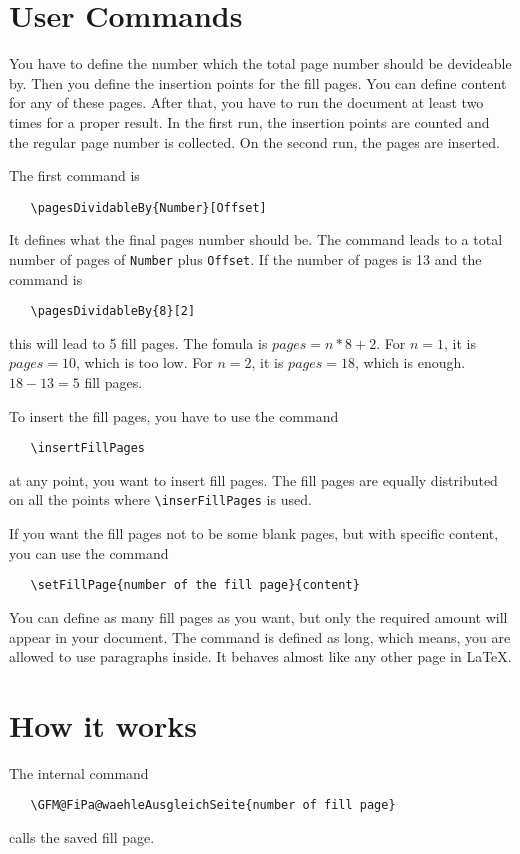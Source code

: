\documentclass[12pt,a4paper]{scrreprt}
\begin{document}
\section{User Commands}
You have to define the number which the total page number should be devideable by. Then you define the insertion points for the fill pages. You can define content for any of these pages. After that, you have to run the document at least two times for a proper result. In the first run, the insertion points are counted and the regular page number is collected. On the second run, the pages are inserted.

The first command is
\begin{verbatim}
   \pagesDividableBy{Number}[Offset]
\end{verbatim}
It defines what the final pages number should be. The command leads to a total number of pages of \verb+Number+ plus \verb+Offset+. If the number of pages is 13 and the command is
\begin{verbatim}
   \pagesDividableBy{8}[2]
\end{verbatim}
this will lead to 5 fill pages. The fomula is $pages = n * 8 + 2$. For $n = 1$, it is $pages = 10$, which is too low. For $n = 2$, it is $pages = 18$, which is enough. $18 - 13 = 5$ fill pages. 

To insert the fill pages, you have to use the command
\begin{verbatim}
   \insertFillPages
\end{verbatim}
at any point, you want to insert fill pages. The fill pages are equally distributed on all the points where \verb+\inserFillPages+ is used.

If you want the fill pages not to be some blank pages, but with specific content, you can use the command
\begin{verbatim}
   \setFillPage{number of the fill page}{content}
\end{verbatim}
You can define as many fill pages as you want, but only the required amount will appear in your document. The command is defined as long, which means, you are allowed to use paragraphs inside. It behaves almost like any other page in \LaTeX .

\section{How it works}
The internal command
\begin{verbatim}
   \GFM@FiPa@waehleAusgleichSeite{number of fill page}
\end{verbatim}
calls the saved fill page.
\end{document}
